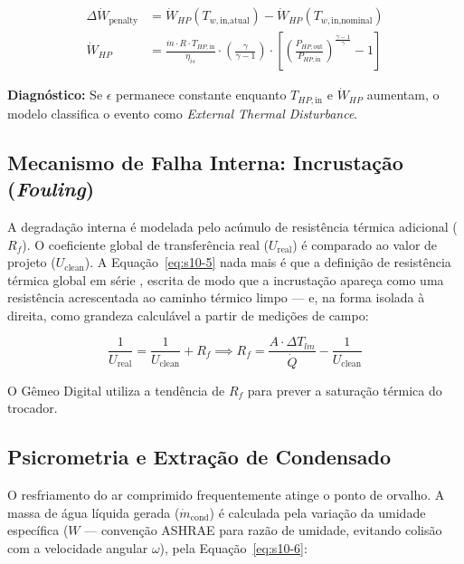 \documentclass[12pt,a4paper]{article}
\numberwithin{equation}{section}
\numberwithin{table}{section}
\numberwithin{figure}{section}
\begin{document}
{	\begin{equation}\label{eq:s10-4}
	\begin{aligned}
		\Delta \dot{W}_{\text{penalty}} &= \dot{W}_{HP}(T_{w,\text{in,atual}}) - \dot{W}_{HP}(T_{w,\text{in,nominal}}) \\[4pt]
		\dot{W}_{HP} &= \frac{\dot{m} \cdot R \cdot T_{HP,\text{in}}}{\eta_{is}} \cdot \left( \frac{\gamma}{\gamma-1} \right) \cdot \left[ \left( \frac{P_{HP,\text{out}}}{P_{HP,\text{in}}} \right)^{\frac{\gamma-1}{\gamma}} - 1 \right]
	\end{aligned}
\end{equation}
	
	\textbf{Diagnóstico:} Se $\epsilon$ permanece constante enquanto $T_{HP,\text{in}}$ e $\dot{W}_{HP}$ aumentam, o modelo classifica o evento como \textit{External Thermal Disturbance}.
	
	\subsection{\textbf{Mecanismo de Falha Interna: Incrustação (\textit{Fouling})}}
	A degradação interna é modelada pelo acúmulo de resistência térmica adicional ($R_f$). O coeficiente global de transferência real ($U_{\text{real}}$) é comparado ao valor de projeto ($U_{\text{clean}}$). A Equação~\eqref{eq:s10-5} nada mais é que a definição de resistência térmica global em série \cite[Cap.~11]{incropera}, escrita de modo que a incrustação apareça como uma resistência acrescentada ao caminho térmico limpo — e, na forma isolada à direita, como grandeza calculável a partir de medições de campo:
	
	\begin{equation}\label{eq:s10-5}
	\frac{1}{U_{\text{real}}} = \frac{1}{U_{\text{clean}}} + R_f \implies R_f = \frac{A \cdot \Delta T_{lm}}{\dot{Q}} - \frac{1}{U_{\text{clean}}}
\end{equation}
	
	O Gêmeo Digital utiliza a tendência de $R_f$ para prever a saturação térmica do trocador.
	
	\subsection{\textbf{Psicrometria e Extração de Condensado}}
	O resfriamento do ar comprimido frequentemente atinge o ponto de orvalho. A massa de água líquida gerada ($\dot{m}_{\text{cond}}$) é calculada pela variação da umidade específica ($W$ — convenção ASHRAE \cite{ashrae} para razão de umidade, evitando colisão com a velocidade angular $\omega$), pela Equação~\eqref{eq:s10-6}:

}
\end{document}
